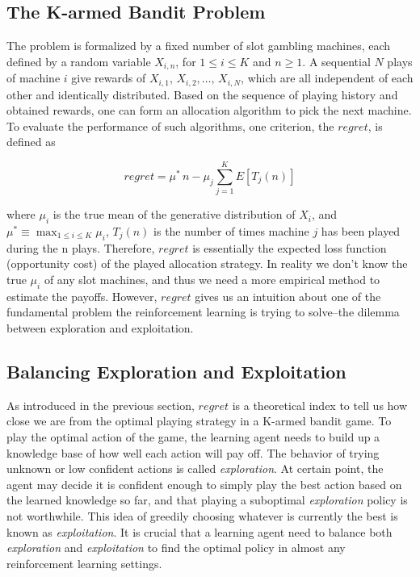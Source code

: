 \documentclass[conference]{IEEEtran}
\begin{document}
\subsection{The K-armed Bandit Problem}
The problem is formalized by a fixed number of slot gambling machines, each defined by a random variable $X_{i,n}$, for $1\leq i \leq K$ and $n \geq 1$. A sequential $N$ plays of machine $i$ give rewards of $X_{i,1},\,X_{i,2},\dots,\, X_{i,N}$, which are all independent of each other and identically distributed. Based on the sequence of playing history and obtained rewards, one can form an allocation algorithm to pick the next machine. To evaluate the performance of such algorithms, one criterion, the $regret$, is defined as

\begin{equation*}
	regret = \mu^{*}\,n - \mu_j \sum_{j=1}^K E[T_j(n)]
\end{equation*}

\noindent where $\mu_i$ is the true mean of the generative distribution of $X_i$, and $\mu^{*} \equiv \max_{1\leq i \leq K} \mu_i$, $T_j(n)$ is the number of times machine $j$ has been played during the n plays. Therefore, $regret$ is essentially the expected loss function (opportunity cost) of the played allocation strategy. In reality we don't know the true $\mu_i$ of any slot machines, and thus we need a more empirical method to estimate the payoffs. However, $regret$ gives us an intuition about one of the fundamental problem the reinforcement learning is trying to solve--the dilemma between exploration and exploitation.

\subsection{Balancing Exploration and Exploitation}
As introduced in the previous section, $regret$ is a theoretical index to tell us how close we are from the optimal playing strategy in a K-armed bandit game. To play the optimal action of the game, the learning agent needs to build up a knowledge base of how well each action will pay off. The behavior of trying unknown or low confident actions is called \emph{exploration}. At certain point, the agent may decide it is confident enough to simply play the best action based on the learned knowledge so far, and that playing a suboptimal \emph{exploration} policy is not worthwhile. This idea of greedily choosing whatever is currently the best is known as \emph{exploitation}. It is crucial that a learning agent need to balance both \emph{exploration} and \emph{exploitation} to find the optimal policy in almost any reinforcement learning settings. 
\end{document}
